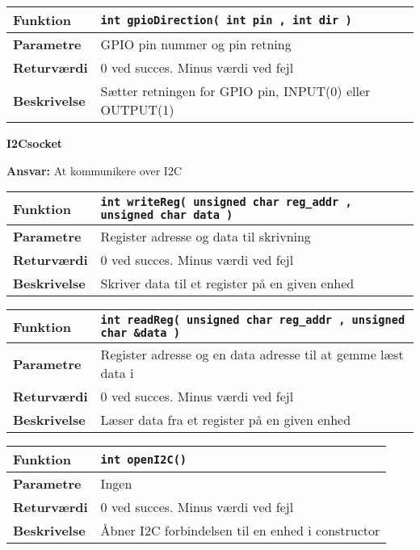 \begin{center}
    \begin{tabular}{ | l | p{} |}
    \hline
    \textbf{Funktion}	& \verb+int gpioDirection( int pin , int dir ) +			\\ \hline
    \textbf{Parametre} 	& GPIO pin nummer og pin retning							\\ \hline
    \textbf{Returværdi}	& 0 ved succes. Minus værdi ved fejl						\\ \hline
    \textbf{Beskrivelse}	& Sætter retningen for GPIO pin, INPUT(0) eller OUTPUT(1)	\\ \hline
    \end{tabular}
\end{center}

{\centering
\textbf{I2Csocket}\par
}
\textbf{Ansvar:} At kommunikere over I2C \

\begin{center}
    \begin{tabular}{ | l | p{} |}
    \hline
    \textbf{Funktion}	& \verb+int writeReg( unsigned char reg_addr , unsigned char data ) +	\\ \hline
    \textbf{Parametre} 	& Register adresse og data til skrivning	\\ \hline
    \textbf{Returværdi}	& 0 ved succes. Minus værdi ved fejl \\ \hline
    \textbf{Beskrivelse}	& Skriver data til et register på en given enhed \\ \hline
    \end{tabular}
\end{center}

\begin{center}
    \begin{tabular}{ | l | p{} |}
    \hline
    \textbf{Funktion}	& \verb+int readReg( unsigned char reg_addr , unsigned char &data ) +\\ \hline
    \textbf{Parametre} 	& Register adresse og en data adresse til at gemme læst data i\\ \hline
    \textbf{Returværdi}	& 0 ved succes. Minus værdi ved fejl\\ \hline
    \textbf{Beskrivelse}	& Læser data fra et register på en given enhed\\ \hline
    \end{tabular}
\end{center}

\begin{center}
    \begin{tabular}{ | l | p{} |}
    \hline
    \textbf{Funktion}	& \verb+int openI2C() + \\ \hline
    \textbf{Parametre} 	& Ingen \\ \hline
    \textbf{Returværdi}	& 0 ved succes. Minus værdi ved fejl \\ \hline
    \textbf{Beskrivelse}	& Åbner I2C forbindelsen til en enhed i constructor \\ \hline
    \end{tabular}
\end{center}

